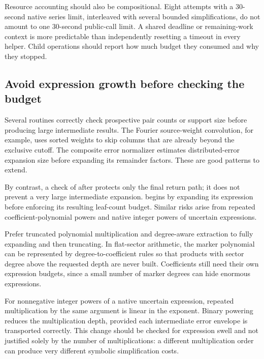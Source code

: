 \documentclass[11pt,a4paper]{article}
\newcommand{\code}[1]{\texttt{\detokenize{#1}}}
\theoremstyle{definition}
\begin{document}
Resource accounting should also be compositional. Eight attempts with a 30-second native series limit, interleaved with several bounded simplifications, do not amount to one 30-second public-call limit. A shared deadline or remaining-work context is more predictable than independently resetting a timeout in every helper. Child operations should report how much budget they consumed and why they stopped.\cite{native,envelopes}

\subsection{Avoid expression growth before checking the budget}

Several routines correctly check prospective pair counts or support size before producing large intermediate results. The Fourier source-weight convolution, for example, uses sorted weights to skip columns that are already beyond the exclusive cutoff. The composite error normalizer estimates distributed-error expansion size before expanding its remainder factors. These are good patterns to extend.\cite{fourier,envelopes}

By contrast, a check of \code{LeafCount[result]} after \code{Expand} protects only the final return path; it does not prevent a very large intermediate expansion. \code{flatTrim} begins by expanding its expression before enforcing its resulting leaf-count budget. Similar risks arise from repeated coefficient-polynomial powers and native integer powers of uncertain expressions.\cite{flat,native,incremental}

Prefer truncated polynomial multiplication and degree-aware extraction to fully expanding and then truncating. In flat-sector arithmetic, the marker polynomial can be represented by degree-to-coefficient rules so that products with sector degree above the requested depth are never built. Coefficients still need their own expression budgets, since a small number of marker degrees can hide enormous expressions.

For nonnegative integer powers of a native uncertain expression, repeated multiplication by the same argument is linear in the exponent. Binary powering reduces the multiplication depth, provided each intermediate error envelope is transported correctly. This change should be checked for expression swell and not justified solely by the number of multiplications: a different multiplication order can produce very different symbolic simplification costs.\cite{native}
\end{document}
